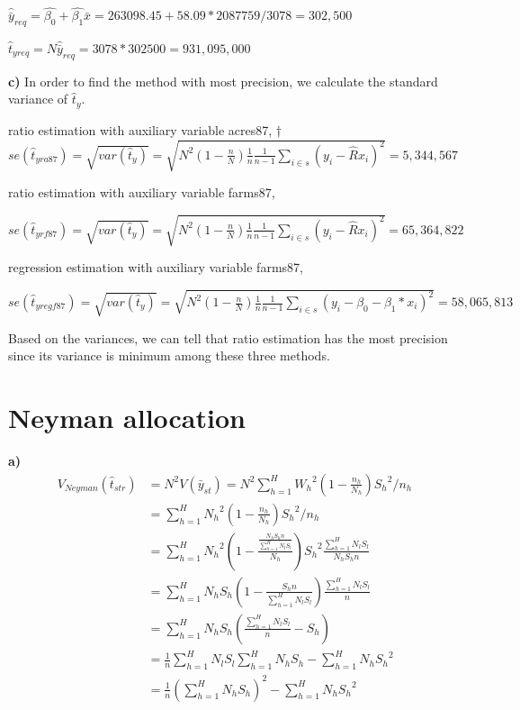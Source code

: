 \documentclass[11pt]{article}
\begin{document}
$\hat{\bar{y}}_{req} = \hat{\beta_0} + \hat{\beta_1}\bar{x} =263098.45 +  58.09 * 2087759/3078 =   302,500$

$\hat{t}_{{yreq}} = N\hat{\bar{y}}_{req} =3078 * 302500 = 931,095,000 $

\textbf{c)}
In order to find the method with most precision, we calculate the standard variance of $ \hat{t}_y$.

ratio estimation with auxiliary variable acres87,
†
$ se(\hat{t}_{yra87}) = \sqrt{var(\hat{t}_y)} = \sqrt{N^2(1-\frac{n}{N})\frac{1}{n}\frac{1}{n-1}\sum_{i\in s}^{}{(y_i - \hat{R}x_i)^2}} = 5,344,567$

ratio estimation with auxiliary variable farms87,

$ se(\hat{t}_{yrf87}) = \sqrt{var(\hat{t}_y)} = \sqrt{N^2(1-\frac{n}{N})\frac{1}{n}\frac{1}{n-1}\sum_{i\in s}^{}{(y_i - \hat{R}x_i)^2}} = 65,364,822$

regression estimation with auxiliary variable farms87,

$ se(\hat{t}_{yregf87}) = \sqrt{var(\hat{t}_y)} = \sqrt{N^2(1-\frac{n}{N})\frac{1}{n}\frac{1}{n-1}\sum_{i\in s}^{}{(y_i - \beta_0 - \beta_1*x_i)^2}} = 58,065,813$

Based on the variances, we can tell that ratio estimation has the most precision since its variance is minimum among these three methods.

\section{Neyman allocation}
\textbf{a)}
\begin{align*} 
V_{Neyman}(\hat{t}_{str}) & = N^2V(\bar{y}_{st}) = N^2\sum_{h=1}^{H}{{W_h}^2(1-\frac{n_h}{N_h}){S_h}^2/n_h} \\ 
& = \sum_{h=1}^{H}{{N_h}^2(1-\frac{n_h}{N_h}){S_h}^2/n_h} \\
& = \sum_{h=1}^{H}{{N_h}^2(1-\frac{\frac{N_hS_hn}{\sum_{h=1}^{H}{N_lS_l}}}{N_h}){S_h}^2\frac{\sum_{h=1}^{H}{N_lS_l}}{N_hS_hn}}\\
& = \sum_{h=1}^{H}{N_hS_h(1-\frac{S_hn}{\sum_{h=1}^{H}{N_lS_l}})\frac{\sum_{h=1}^{H}{N_lS_l}}{n}}\\
& = \sum_{h=1}^{H}{N_hS_h(\frac{\sum_{h=1}^{H}{N_lS_l}}{n}-S_h)}\\
& = \frac{1}{n}\sum_{h=1}^{H}{N_lS_l}\sum_{h=1}^{H}{N_hS_h} - \sum_{h=1}^{H}{N_h{S_h}^2}\\
& = \frac{1}{n}(\sum_{h=1}^{H}{N_hS_h})^2 - \sum_{h=1}^{H}{N_h{S_h}^2}
\end{align*}
\end{document}
